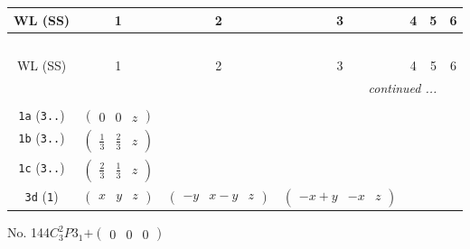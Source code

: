 \documentclass[fleqn,9pt,landscape]{jsarticle}
\begin{document}
\begin{center}
\renewcommand{\arraystretch}{1.2}
\begin{longtable}{ccccccc}
 \hline \hline
WL (SS) & 1 & 2 & 3 & 4 & 5 & 6 \\ \hline \endfirsthead

\multicolumn{6}{l}{\tablename\ \thetable{}} \\
 \hline \hline
WL (SS) & 1 & 2 & 3 & 4 & 5 & 6 \\ \hline \endhead

 \hline \hline
\multicolumn{6}{r}{\footnotesize\it continued ...} \\ \endfoot

 \hline \hline
\multicolumn{6}{r}{} \\ \endlastfoot

{\tt 1a} ({\tt 3..}) & $ \begin{pmatrix} 0 & 0 & z \end{pmatrix} $ & $  $ & $  $ \\ \hline
{\tt 1b} ({\tt 3..}) & $ \begin{pmatrix} \frac{1}{3} & \frac{2}{3} & z \end{pmatrix} $ & $  $ & $  $ \\ \hline
{\tt 1c} ({\tt 3..}) & $ \begin{pmatrix} \frac{2}{3} & \frac{1}{3} & z \end{pmatrix} $ & $  $ & $  $ \\ \hline
{\tt 3d} ({\tt 1}) & $ \begin{pmatrix} x & y & z \end{pmatrix} $ & $ \begin{pmatrix} - y & x - y & z \end{pmatrix} $ & $ \begin{pmatrix} - x + y & - x & z \end{pmatrix} $ \\
\end{longtable}
\end{center}
\newpage
No. 144\quad$C_{3}^{2}$\quad$P3_1$\quad[ trigonal ]\quad$+\begin{pmatrix} 0 & 0 & 0 \end{pmatrix}$
\end{document}
